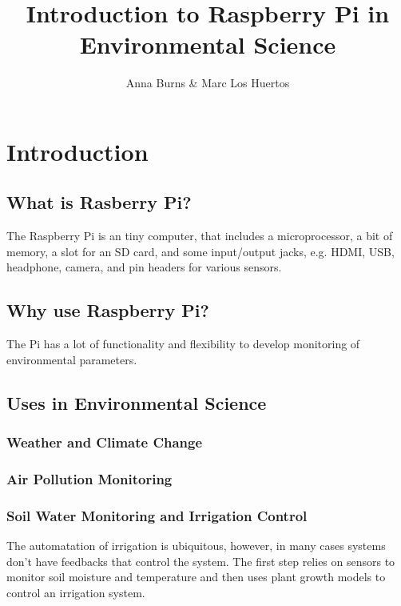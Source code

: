 \documentclass{article}\usepackage[]{graphicx}\usepackage[]{color}
\author{Anna Burns \& Marc Los Huertos}
\title{Introduction to Raspberry Pi in Environmental Science}
\begin{document}
\maketitle

\section{Introduction}

\subsection{What is Rasberry Pi?}

The Raspberry Pi is an tiny computer, that includes a microprocessor, a bit of memory, a slot for an SD card, and some input/output jacks, e.g. HDMI, USB, headphone, camera, and pin headers for various sensors.

\subsection{Why use Raspberry Pi?}

The Pi has a lot of functionality and flexibility to develop monitoring of environmental parameters. 

\subsection{Uses in Environmental Science}

\subsubsection{Weather and Climate Change}

\subsubsection{Air Pollution Monitoring}

\subsubsection{Soil Water Monitoring and Irrigation Control}

The automatation of irrigation is ubiquitous, however, in many cases systems don't have feedbacks that control the system. The first step relies on sensors to monitor soil moisture and temperature and then uses plant growth models to control an irrigation system. 
\end{document}
